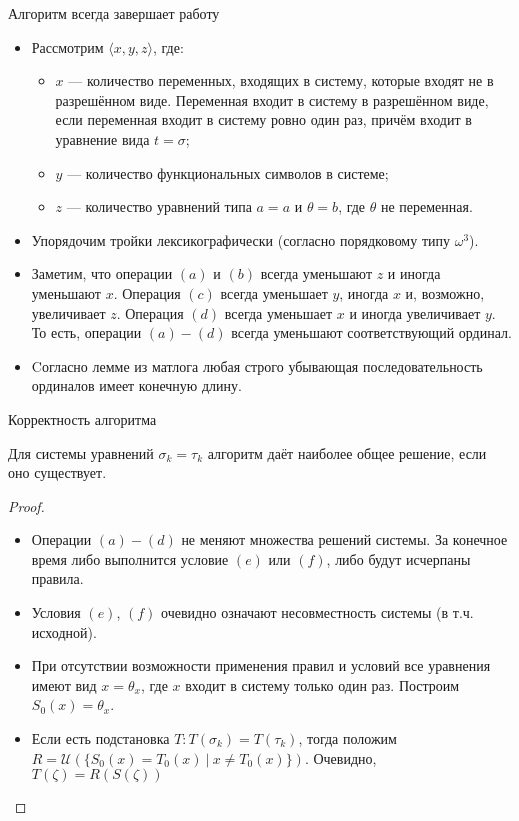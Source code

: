 \documentclass[aspectratio=169]{beamer}
\begin{document}
\begin{frame}{Алгоритм всегда завершает работу}
\begin{itemize}
\item Рассмотрим $\langle x,y,z \rangle$,
где:
\begin{itemize}\item $x$ --- количество переменных, входящих в систему, которые входят не в разрешённом виде.
Переменная входит в систему в разрешённом виде, если переменная входит в систему ровно один раз, причём входит в уравнение вида $t = \sigma$;
\item $y$ --- количество функциональных символов в системе;
\item $z$ --- количество уравнений типа $a=a$ и $\theta=b$, где $\theta$ не переменная.
\end{itemize}
\item Упорядочим тройки лексикографически (согласно порядковому типу $\omega^3$).

\item Заметим, что операции $(a)$ и $(b)$ всегда уменьшают $z$ и иногда уменьшают $x$.
Операция $(c)$ всегда уменьшает $y$, иногда $x$ и, возможно, увеличивает $z$.
Операция $(d)$ всегда уменьшает $x$ и иногда увеличивает $y$. То есть, операции $(a)-(d)$ всегда уменьшают
соответствующий ординал.

\item Cогласно лемме из матлога любая строго убывающая последовательность ординалов имеет конечную длину.
\end{itemize}
\end{frame}

\begin{frame}{Корректность алгоритма}
\begin{thm}Для системы уравнений $\sigma_k = \tau_k$ алгоритм даёт наиболее общее решение, если оно существует.\end{thm}
\begin{proof}
\begin{itemize}
\item Операции $(a)-(d)$ не меняют множества решений системы. За конечное время либо выполнится условие $(e)$ или $(f)$,
либо будут исчерпаны правила.
\item Условия $(e)$, $(f)$ очевидно означают несовместность системы (в т.ч. исходной).
\item При отсутствии возможности применения правил и условий все уравнения имеют вид $x = \theta_x$,
где $x$ входит в систему только один раз. Построим $S_0(x) = \theta_x$. 

\item Если есть подстановка $T: T(\sigma_k) = T(\tau_k)$, тогда положим $R = \mathcal{U}(\{ S_0(x) = T_0(x)\ |\ x \ne T_0(x)\})$.
Очевидно, $T(\zeta) = R(S(\zeta))$
\end{itemize}
\end{proof}
\end{frame}
\end{document}
